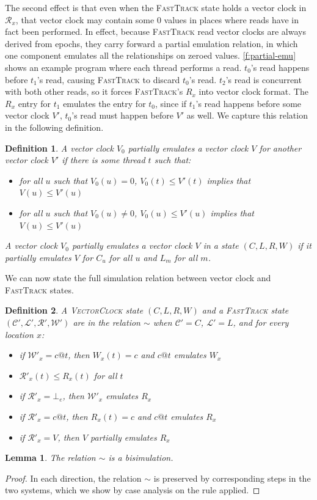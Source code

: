 \documentclass[preprint, 10pt]{sigplanconf}
\newcommand{\Tid}{t}
\newcommand{\VC}{V}
\newcommand{\VCalg}{\textsc{VectorClock}\xspace}
\newcommand{\FT}{\textsc{FastTrack}\xspace}
\newtheorem{lemma}{Lemma}
\newtheorem{definition}{Definition}
\begin{document}
The second effect is that even when the \FT state holds a vector clock in $\mathcal{R}_x$, that vector clock may contain some 0 values in places where reads have in fact been performed. In effect, because \FT read vector clocks are always derived from epochs, they carry forward a partial emulation relation, in which one component emulates all the relationships on zeroed values. \autoref{f:partial-emu} shows an example program where each thread performs a read. $\Tid_0$'s read happens before $\Tid_1$'s read, causing \FT to discard $\Tid_0$'s read. $\Tid_2$'s read is concurrent with both other reads, so it forces \FT's $R_x$ into vector clock format. The $R_x$ entry for $\Tid_1$ emulates the entry for $\Tid_0$, since if $\Tid_1$'s read happens before some vector clock $\VC'$, $\Tid_0$'s read must happen before $\VC'$ as well. We capture this relation in the following definition.
\begin{definition}A vector clock $V_0$ \emph{partially emulates} a vector clock $V$ for another vector clock $V'$ if there is some thread $t$ such that:

\begin{itemize}
\item for all $u$ such that $V_0(u) = 0$, $V_0(t) \le V'(t)$ implies that $V(u) \le V'(u)$
\item for all $u$ such that $V_0(u) \neq 0$, $V_0(u) \le V'(u)$ implies that $V(u) \le V'(u)$
\end{itemize}
A vector clock $V_0$ partially emulates a vector clock $V$ in a state $(C, L, R, W)$ if it partially emulates $V$ for $C_u$ for all $u$ and $L_m$ for all $m$.\end{definition}

We can now state the full simulation relation between vector clock and \FT states.
\begin{definition}A \VCalg state $(C, L, R, W)$ and a \FT state $(\mathcal{C}', \mathcal{L}', \mathcal{R}', \mathcal{W}')$ are in the relation $\sim$ when $\mathcal{C}' = C$, $\mathcal{L}' = L$, and for every location $x$:
\begin{itemize}
\item if $\mathcal{W}'_x = c@t$, then $W_x(t) = c$ and $c@t$ emulates $W_x$
\item $\mathcal{R}'_x(t) \le R_x(t)$ for all $t$
\item if $\mathcal{R}'_x = \bot_e$, then $\mathcal{W}'_x$ emulates $R_x$
\item if $\mathcal{R}'_x = c@t$, then $R_x(t) = c$ and $c@t$ emulates $R_x$
\item if $\mathcal{R}'_x = V$, then $V$ partially emulates $R_x$
\end{itemize}
\end{definition}
\begin{lemma}The relation $\sim$ is a bisimulation.\end{lemma}
\begin{proof}In each direction, the relation $\sim$ is preserved by corresponding steps in the two systems, which we show by case analysis on the rule applied.\end{proof}
\end{document}
